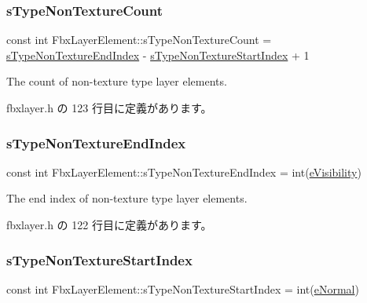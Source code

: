 \subsubsection{\texorpdfstring{s\+Type\+Non\+Texture\+Count}{sTypeNonTextureCount}}
{\footnotesize\ttfamily const int Fbx\+Layer\+Element\+::s\+Type\+Non\+Texture\+Count = \hyperlink{class_fbx_layer_element_a5f1b9591af5822bec240657d21261b43}{s\+Type\+Non\+Texture\+End\+Index} -\/ \hyperlink{class_fbx_layer_element_a13fe30eb6e884901f5ce503f095c716e}{s\+Type\+Non\+Texture\+Start\+Index} + 1\hspace{0.3cm}{\ttfamily [static]}}



The count of non-\/texture type layer elements. 



 fbxlayer.\+h の 123 行目に定義があります。

\mbox{\label{class_fbx_layer_element_a5f1b9591af5822bec240657d21261b43}} 
\subsubsection{\texorpdfstring{s\+Type\+Non\+Texture\+End\+Index}{sTypeNonTextureEndIndex}}
{\footnotesize\ttfamily const int Fbx\+Layer\+Element\+::s\+Type\+Non\+Texture\+End\+Index = int(\hyperlink{class_fbx_layer_element_a8c95c5cd880b56c776acd379bd86f42caf85ca5a4db121af287f52758964e0511}{e\+Visibility})\hspace{0.3cm}{\ttfamily [static]}}



The end index of non-\/texture type layer elements. 



 fbxlayer.\+h の 122 行目に定義があります。

\mbox{\label{class_fbx_layer_element_a13fe30eb6e884901f5ce503f095c716e}} 
\subsubsection{\texorpdfstring{s\+Type\+Non\+Texture\+Start\+Index}{sTypeNonTextureStartIndex}}
{\footnotesize\ttfamily const int Fbx\+Layer\+Element\+::s\+Type\+Non\+Texture\+Start\+Index = int(\hyperlink{class_fbx_layer_element_a8c95c5cd880b56c776acd379bd86f42cae9b273e2ecbd6c3d1443447d85787f14}{e\+Normal})\hspace{0.3cm}{\ttfamily [static]}}




